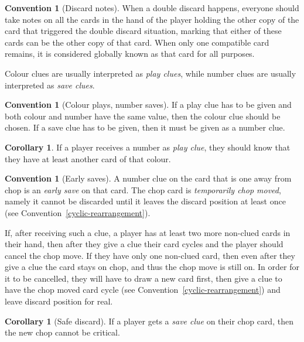 \documentclass[a4paper]{article}
\theoremstyle{plain}
\theoremstyle{definition}
\newtheorem{corollary}[theorem]{Corollary}
\newtheorem{convention}[theorem]{Convention}
\begin{document}
\begin{convention}[Discard notes]
	\label{discard-notes}
	When a double discard happens, everyone should take notes on all the cards in the hand of the player holding the other copy of the card that triggered the double discard situation, marking that either of these cards can be the other copy of that card. When only one compatible card remains, it is considered globally known as that card for all purposes.
\end{convention}

Colour clues are usually interpreted as \emph{play clues}, while number clues are usually interpreted as \emph{save clues}.

\begin{convention}[Colour plays, number saves]
	If a play clue has to be given and both colour and number have the same value, then the colour clue should be chosen. If a save clue has to be given, then it must be given as a number clue.
\end{convention}

\begin{corollary}
	If a player receives a number as \emph{play clue}, they should know that they have at least another card of that colour.
\end{corollary}

\begin{convention}[Early saves]
	A number clue on the card that is one away from chop is an \emph{early save} on that card. The chop card is \emph{temporarily chop moved}, namely it cannot be discarded until it leaves the discard position at least once (see Convention~\ref{cyclic-rearrangement}).
\end{convention}

If, after receiving such a clue, a player has at least two more non-clued cards in their hand, then after they give a clue their card cycles and the player should cancel the chop move. If they have only one non-clued card, then even after they give a clue the card stays on chop, and thus the chop move is still on. In order for it to be cancelled, they will have to draw a new card first, then give a clue to have the chop moved card cycle (see Convention~\ref{cyclic-rearrangement}) and leave discard position for real.

\begin{corollary}[Safe discard]
	If a player gets a \emph{save clue} on their chop card, then the new chop cannot be critical.
\end{corollary}
\end{document}
